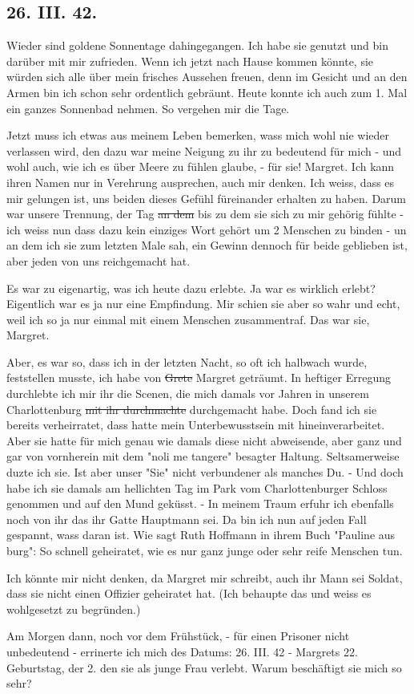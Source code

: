 \subsection{26. III. 42.}

Wieder sind goldene Sonnentage dahingegangen.
Ich habe sie genutzt und bin dar\"{u}ber mit mir zufrieden.
Wenn ich jetzt nach Hause kommen k\"{o}nnte, sie w\"{u}rden sich alle \"{u}ber mein frisches Aussehen freuen, denn im Gesicht und an den Armen bin ich schon sehr ordentlich gebr\"{a}unt.
Heute konnte ich auch zum 1. Mal ein ganzes Sonnenbad nehmen.
So vergehen mir die Tage.

Jetzt muss ich etwas aus meinem Leben bemerken, wass mich wohl nie wieder verlassen wird, den dazu war meine Neigung zu ihr zu bedeutend f\"{u}r mich - und wohl auch, wie ich es \"{u}ber Meere zu f\"{u}hlen glaube, - f\"{u}r sie!
Margret.
Ich kann ihren Namen nur in Verehrung ausprechen, auch mir denken.
Ich weiss, dass es mir gelungen ist, uns beiden dieses Gef\"{u}hl f\"{u}reinander erhalten zu haben.
Darum war unsere Trennung, der Tag \st{an dem} bis zu dem sie sich zu mir geh\"{o}rig f\"{u}hlte - ich weiss nun dass dazu kein einziges Wort geh\"{o}rt um 2 Menschen zu binden - un an dem ich sie zum letzten Male sah, ein Gewinn dennoch f\"{u}r beide geblieben ist, aber jeden von uns reichgemacht hat.

Es war zu eigenartig, was ich heute dazu erlebte.
Ja war es wirklich erlebt?
Eigentlich war es ja nur eine Empfindung.
Mir schien sie aber so wahr und echt, weil ich so ja nur einmal mit einem Menschen zusammentraf.
Das war sie, Margret.

Aber, es war so, dass ich in der letzten Nacht, so oft ich halbwach wurde, feststellen musste, ich habe von \st{Grete} Margret getr\"{a}umt.
In heftiger Erregung durchlebte ich mir ihr die Scenen, die mich damals vor Jahren in unserem Charlottenburg \st{mit ihr durchmachte} durchgemacht habe.
Doch fand ich sie bereits verheirratet, dass hatte mein Unterbewusstsein mit hineinverarbeitet.
Aber sie hatte f\"{u}r mich genau wie damals diese nicht abweisende, aber ganz und gar von vornherein mit dem "noli me tangere" besagter Haltung.
Seltsamerweise duzte ich sie.
Ist aber unser "Sie" nicht verbundener als manches Du.
- Und doch habe ich sie damals am hellichten Tag im Park vom Charlottenburger Schloss genommen und auf den Mund gek\"{u}sst.
- In meinem Traum erfuhr ich ebenfalls noch von ihr das ihr Gatte Hauptmann sei.
Da bin ich nun auf jeden Fall gespannt, wass daran ist.
Wie sagt Ruth Hoffmann in ihrem Buch "Pauline aus {\Cross}burg": So schnell geheiratet, wie es nur ganz junge oder sehr reife Menschen tun.

Ich k\"{o}nnte mir nicht denken, da Margret mir schreibt, auch ihr Mann sei Soldat, dass sie nicht einen Offizier geheiratet hat.
(Ich behaupte das und weiss es wohlgesetzt zu begr\"{u}nden.)

Am Morgen dann, noch vor dem Fr\"{u}hst\"{u}ck, - f\"{u}r einen Prisoner nicht unbedeutend - errinerte ich mich des Datums: 26. III. 42 - Margrets 22. Geburtstag, der 2. den sie als junge Frau verlebt.
Warum besch\"{a}ftigt sie mich so sehr?

\clearpage
